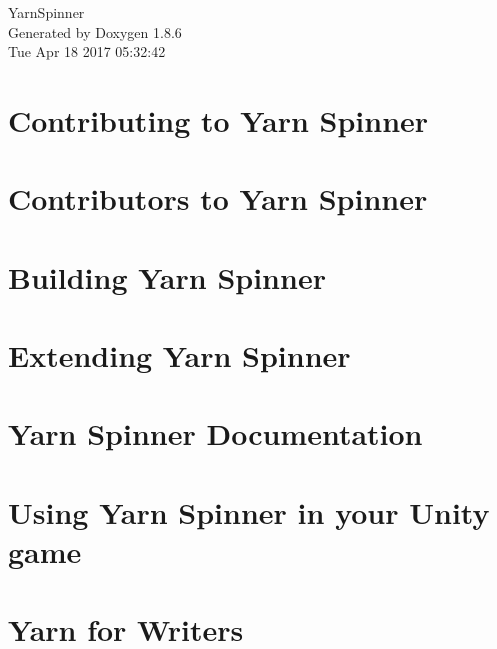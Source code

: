 \documentclass[twoside]{book}
\newcommand{\clearemptydoublepage}{%
  \newpage{\pagestyle{empty}\cleardoublepage}%
}
\begin{document}
\hypersetup{pageanchor=false}
\begin{titlepage}
\vspace*{7cm}
\begin{center}%
{\Large Yarn\-Spinner }\\
\vspace*{1cm}
{\large Generated by Doxygen 1.8.6}\\
\vspace*{0.5cm}
{\small Tue Apr 18 2017 05:32:42}\\
\end{center}
\end{titlepage}
\clearemptydoublepage
\tableofcontents
\clearemptydoublepage
{}
\hypersetup{pageanchor=true}

\chapter{Contributing to Yarn Spinner}
\label{d7/d46/a00002}
\hypertarget{d7/d46/a00002}{}

\chapter{Contributors to Yarn Spinner}
\label{d0/d0b/a00004}
\hypertarget{d0/d0b/a00004}{}

\chapter{Building Yarn Spinner}
\label{de/d21/a00006}
\hypertarget{de/d21/a00006}{}

\chapter{Extending Yarn Spinner}
\label{d4/dee/a00008}
\hypertarget{d4/dee/a00008}{}

\chapter{Yarn Spinner Documentation}
\label{d7/dec/a00010}
\hypertarget{d7/dec/a00010}{}

\chapter{Using Yarn Spinner in your Unity game}
\label{df/d86/a00012}
\hypertarget{df/d86/a00012}{}

\chapter{Yarn for Writers}
\label{d2/de7/a00014}
\hypertarget{d2/de7/a00014}{}

\end{document}
